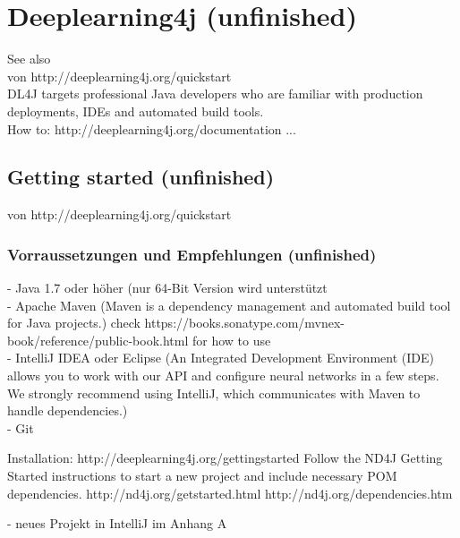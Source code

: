 \chapter{Deeplearning4j (unfinished)}
{See also \cite{DL4J}\\
von http://deeplearning4j.org/quickstart\\
DL4J targets professional Java developers who are familiar with production deployments, IDEs and automated build tools.\\

How to:
http://deeplearning4j.org/documentation
...

\section{Getting started (unfinished)}
von http://deeplearning4j.org/quickstart\\

\subsection{Vorraussetzungen und Empfehlungen (unfinished)}
- Java 1.7 oder höher (nur 64-Bit Version wird unterstützt\\
- Apache Maven (Maven is a dependency management and automated build tool for Java projects.) check https://books.sonatype.com/mvnex-book/reference/public-book.html for how to use\\
- IntelliJ IDEA oder Eclipse (An Integrated Development Environment (IDE) allows you to work with our API and configure neural networks in a few steps. We strongly recommend using IntelliJ, which communicates with Maven to handle dependencies.)\\
- Git

Installation:
http://deeplearning4j.org/gettingstarted
Follow the ND4J Getting Started instructions to start a new project and include necessary POM dependencies.
http://nd4j.org/getstarted.html
http://nd4j.org/dependencies.htm

- neues Projekt in IntelliJ im Anhang A


}
